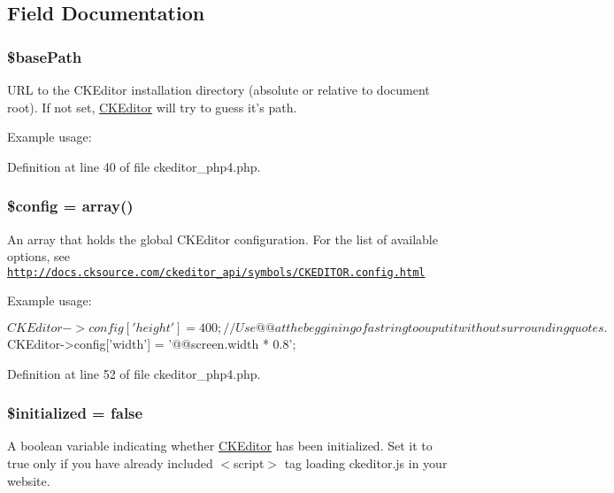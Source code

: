 \subsection{Field Documentation}
\hypertarget{classCKEditor_a9cd745428004768fe921475a29a7d870}{
\subsubsection[{\$basePath}]{\setlength{\rightskip}{0pt plus 5cm}\${\bf basePath}}}
\label{classCKEditor_a9cd745428004768fe921475a29a7d870}
URL to the CKEditor installation directory (absolute or relative to document root). If not set, \hyperlink{classCKEditor}{CKEditor} will try to guess it's path.

Example usage: 
 

Definition at line 40 of file ckeditor\_\-php4.php.

\hypertarget{classCKEditor_a49c7011be9c979d9174c52a8b83e5d8e}{
\subsubsection[{\$config}]{\setlength{\rightskip}{0pt plus 5cm}\${\bf config} = {\bf array}()}}
\label{classCKEditor_a49c7011be9c979d9174c52a8b83e5d8e}
An array that holds the global CKEditor configuration. For the list of available options, see \href{http://docs.cksource.com/ckeditor_api/symbols/CKEDITOR.config.html}{\tt http://docs.cksource.com/ckeditor\_\-api/symbols/CKEDITOR.config.html}

Example usage: 
\begin{DoxyCode}
 $CKEditor->config['height'] = 400;
 // Use @@ at the beggining of a string to ouput it without surrounding quotes.
 $CKEditor->config['width'] = '@@screen.width * 0.8';
\end{DoxyCode}
 

Definition at line 52 of file ckeditor\_\-php4.php.

\hypertarget{classCKEditor_a533c66c9995bd9f022b5f5b325c12ad4}{
\subsubsection[{\$initialized}]{\setlength{\rightskip}{0pt plus 5cm}\$initialized = false}}
\label{classCKEditor_a533c66c9995bd9f022b5f5b325c12ad4}
A boolean variable indicating whether \hyperlink{classCKEditor}{CKEditor} has been initialized. Set it to true only if you have already included $<$script$>$ tag loading ckeditor.js in your website. 

